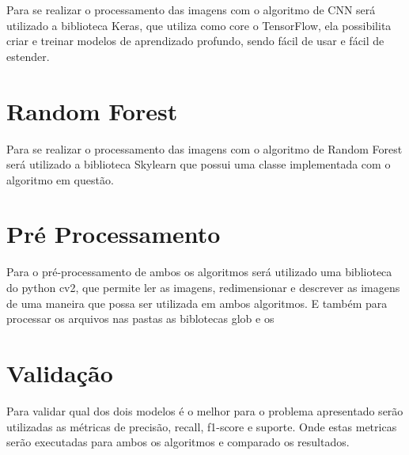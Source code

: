 Para se realizar o processamento das imagens com o algoritmo de CNN será utilizado a biblioteca Keras, que utiliza como core o TensorFlow, ela possibilita criar e treinar modelos de aprendizado profundo, sendo fácil de usar e fácil de estender.

\section{Random Forest}

Para se realizar o processamento das imagens com o algoritmo de Random Forest será utilizado a biblioteca Skylearn que possui uma classe implementada com o algoritmo em questão.

\section{Pré Processamento}

Para o pré-processamento de ambos os algoritmos será utilizado uma biblioteca do python cv2, que permite ler as imagens, redimensionar e descrever as imagens de uma maneira que possa ser utilizada em ambos algoritmos. E também para processar os arquivos nas pastas as biblotecas glob e os

\section{Validação}

Para validar qual dos dois modelos é o melhor para o problema apresentado serão utilizadas as métricas de precisão, recall, f1-score e suporte. Onde estas metricas serão executadas para ambos os algoritmos e comparado os resultados.